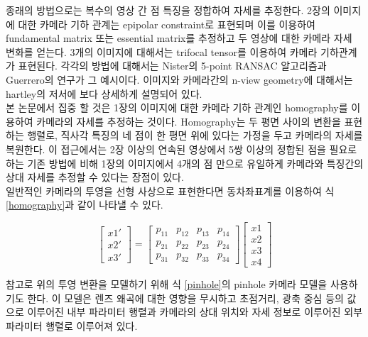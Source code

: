 \documentclass[master,korean,final]{cbnu-ecs}
\begin{document}
종래의 방법으로는 복수의 영상 간 점 특징을 정합하여 자세를 추정한다. 2장의 이미지에 대한 카메라 기하 관계는 epipolar constraint로 표현되며 이를 이용하여 fundamental matrix 또는 essential matrix를 추정하고 두 영상에 대한 카메라 자세 변화를 얻는다. 3개의 이미지에 대해서는 trifocal tensor를 이용하여 카메라 기하관계가 표현된다. 각각의 방법에 대해서는 Nister의 5-point RANSAC 알고리즘\cite{Nister2005}과 Guerrero의 연구\cite{Guerrero2008}가 그 예시이다. 이미지와 카메라간의 n-view geometry에 대해서는 hartley의 저서\cite{Hartley2003}에 보다 상세하게 설명되어 있다.\\
본 논문에서 집중 할 것은 1장의 이미지에 대한 카메라 기하 관계인 homography를 이용하여 카메라의 자세를 추정하는 것이다. Homography는 두 평면 사이의 변환을 표현하는 행렬로, 직사각 특징의 네 점이 한 평면 위에 있다는 가정을 두고 카메라의 자세를 복원한다. 이 접근에서는 2장 이상의 연속된 영상에서 5쌍 이상의 정합된 점을 필요로 하는 기존 방법에 비해 1장의 이미지에서 4개의 점 만으로 유일하게 카메라와 특징간의 상대 자세를 추정할 수 있다는 장점이 있다. \\
일반적인 카메라의 투영을 선형 사상으로 표현한다면 동차좌표계를 이용하여 식 \eqref{homography}과 같이 나타낼 수 있다.

\begin{equation}
\begin{bmatrix} x1'\\x2'\\x3' \end{bmatrix} = \begin{bmatrix} p_{11} & p_{12} & p_{13} & p_{14} \\ p_{21} & p_{22} & p_{23} & p_{24}\\ p_{31} & p_{32} & p_{33} & p_{34} \end{bmatrix}\begin{bmatrix} x1\\x2\\x3\\x4 \end{bmatrix} \label{homography}
\end{equation}

참고로 위의 투영 변환을 모델하기 위해 식 \eqref{pinhole}의 pinhole 카메라 모델을 사용하기도 한다. 이 모델은 렌즈 왜곡에 대한 영향을 무시하고 초점거리, 광축 중심 등의 값으로 이루어진 내부 파라미터 행렬과 카메라의 상대 위치와 자세 정보로 이루어진 외부 파라미터 행렬로 이루어져 있다.
\end{document}

